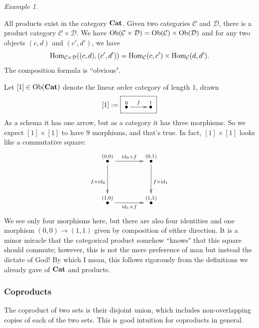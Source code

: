 \documentclass{book}
\def\tn{\textnormal}
\def\mc{\mathcal}
\def\Hom{\tn{Hom}}
\def\Ob{\tn{Ob}}
\def\to{\rightarrow}
\newcommand{\LMO}[1]{\stackrel{#1}{\bullet}}
\def\id{\tn{id}}
\def\Cat{{\bf Cat}}
\def\mcC{\mc{C}}
\def\mcD{\mc{D}}
\theoremstyle{remark}
\newtheorem{example}[subsubsection]{Example}
\theoremstyle{definition}
\begin{document}
\begin{example}\label{ex:[1]x[1]}

All products exist in the category $\Cat$. Given two categories $\mcC$ and $\mcD$, there is a product category $\mcC\times\mcD$. We have $\Ob(\mcC\times\mcD)=\Ob(\mcC)\times\Ob(\mcD)$ and for any two objects $(c,d)$ and $(c',d')$, we have $$\Hom_{\mcC\times\mcD}((c,d),(c',d'))=\Hom_\mcC(c,c')\times\Hom_\mcC(d,d').$$ The composition formula is ``obvious".

Let $[1]\in\Ob(\Cat)$ denote the linear order category of length 1, drawn $$[1]:=\fbox{\xymatrix{\LMO{0}\ar[r]^f&\LMO{1}}}$$ As a schema it has one arrow, but as a category it has three morphisms. So we expect $[1]\times[1]$ to have 9 morphisms, and that's true. In fact, $[1]\times[1]$ looks like a commutative square:
\begin{align}\label{dia:comm square}
\xymatrix@=40pt{
\LMO{(0,0)}\ar[r]^{\id_0\times f}\ar[d]_{f\times\id_0}&\LMO{(0,1)}\ar[d]^{f\times\id_1}\\
\LMO{(1,0)}\ar[r]_{\id_1\times f}&\LMO{(1,1)}}
\end{align}
We see only four morphisms here, but there are also four identities and one morphism $(0,0)\to(1,1)$ given by composition of either direction. It is a minor miracle that the categorical product somehow ``knows" that this square should commute; however, this is not the mere preference of man but instead the dictate of God! By which I mean, this follows rigorously from the definitions we already gave of $\Cat$ and products.

\end{example}


\subsubsection{Coproducts}

The coproduct of two sets is their disjoint union, which includes non-overlapping copies of each of the two sets. This is good intuition for coproducts in general.
\end{document}
